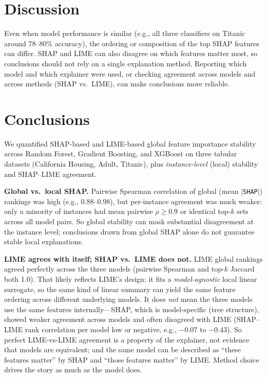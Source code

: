 \documentclass[11pt,a4paper]{article}
\begin{document}
\section{Discussion}
\label{sec:discussion}

Even when model performance is similar (e.g., all three classifiers on Titanic around 78--80\% accuracy), the ordering or composition of the top SHAP features can differ. SHAP and LIME can also disagree on which features matter most, so conclusions should not rely on a single explanation method. Reporting which model and which explainer were used, or checking agreement across models and across methods (SHAP vs.\ LIME), can make conclusions more reliable.

\section{Conclusions}
\label{sec:conclusions}

We quantified SHAP-based and LIME-based global feature importance stability across Random Forest, Gradient Boosting, and XGBoost on three tabular datasets (California Housing, Adult, Titanic), plus \emph{instance-level} (local) stability and SHAP--LIME agreement.

\textbf{Global vs.\ local SHAP.} Pairwise Spearman correlation of global (mean $|$\texttt{SHAP}$|$) rankings was high (e.g., 0.88--0.98), but per-instance agreement was much weaker: only a minority of instances had mean pairwise $\rho \geq 0.9$ or identical top-$k$ sets across all model pairs. So global stability can mask substantial disagreement at the instance level; conclusions drawn from global SHAP alone do not guarantee stable local explanations.

\textbf{LIME agrees with itself; SHAP vs.\ LIME does not.} LIME global rankings agreed perfectly across the three models (pairwise Spearman and top-$k$ Jaccard both 1.0). That likely reflects LIME's design: it fits a \emph{model-agnostic} local linear surrogate, so the same kind of linear summary can yield the same feature ordering across different underlying models. It does \emph{not} mean the three models use the same features internally---SHAP, which is model-specific (tree structure), showed weaker agreement across models and often disagreed with LIME (SHAP--LIME rank correlation per model low or negative, e.g., $-0.07$ to $-0.43$). So perfect LIME-vs-LIME agreement is a property of the explainer, not evidence that models are equivalent; and the same model can be described as ``these features matter'' by SHAP and ``those features matter'' by LIME. Method choice drives the story as much as the model does.
\end{document}
